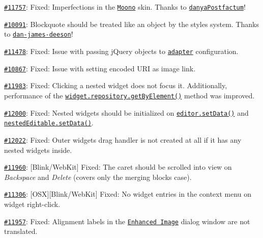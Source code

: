 \begin{DoxyItemize}
\item \href{http://dev.ckeditor.com/ticket/11757}{\tt \#11757}\+: Fixed\+: Imperfections in the \href{http://ckeditor.com/addon/moono}{\tt Moono} skin. Thanks to \href{https://github.com/danyaPostfactum}{\tt danya\+Postfactum}!
\item \href{http://dev.ckeditor.com/ticket/10091}{\tt \#10091}\+: Blockquote should be treated like an object by the styles system. Thanks to \href{https://github.com/dan-james-deeson}{\tt dan-\/james-\/deeson}!
\item \href{http://dev.ckeditor.com/ticket/11478}{\tt \#11478}\+: Fixed\+: Issue with passing j\+Query objects to \href{http://docs.ckeditor.com/#!/guide/dev_jquery}{\tt adapter} configuration.
\item \href{http://dev.ckeditor.com/ticket/10867}{\tt \#10867}\+: Fixed\+: Issue with setting encoded U\+RI as image link.
\item \href{http://dev.ckeditor.com/ticket/11983}{\tt \#11983}\+: Fixed\+: Clicking a nested widget does not focus it. Additionally, performance of the \href{http://docs.ckeditor.com/#!/api/CKEDITOR.plugins.widget.repository-method-getByElement}{\tt {\ttfamily widget.\+repository.\+get\+By\+Element()}} method was improved.
\item \href{http://dev.ckeditor.com/ticket/12000}{\tt \#12000}\+: Fixed\+: Nested widgets should be initialized on \href{http://docs.ckeditor.com/#!/api/CKEDITOR.editor-method-setData}{\tt {\ttfamily editor.\+set\+Data()}} and \href{http://docs.ckeditor.com/#!/api/CKEDITOR.plugins.widget.nestedEditable-method-setData}{\tt {\ttfamily nested\+Editable.\+set\+Data()}}.
\item \href{http://dev.ckeditor.com/ticket/12022}{\tt \#12022}\+: Fixed\+: Outer widget\textquotesingle{}s drag handler is not created at all if it has any nested widgets inside.
\item \href{http://dev.ckeditor.com/ticket/11960}{\tt \#11960}\+: \mbox{[}Blink/\+Web\+Kit\mbox{]} Fixed\+: The caret should be scrolled into view on {\itshape Backspace} and {\itshape Delete} (covers only the merging blocks case).
\item \href{http://dev.ckeditor.com/ticket/11306}{\tt \#11306}\+: \mbox{[}O\+SX\mbox{]}\mbox{[}Blink/\+Web\+Kit\mbox{]} Fixed\+: No widget entries in the context menu on widget right-\/click.
\item \href{http://dev.ckeditor.com/ticket/11957}{\tt \#11957}\+: Fixed\+: Alignment labels in the \href{http://ckeditor.com/addon/image2}{\tt Enhanced Image} dialog window are not translated.

\end{DoxyItemize}
